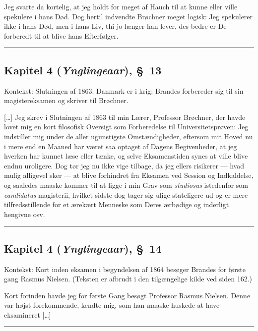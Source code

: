 \documentclass[12pt,a4paper]{article}
\begin{document}
Jeg svarte da kortelig, at jeg holdt for meget af Hauch til at kunne
eller ville spekulere i hans Død. Dog hertil indvendte Brøchner meget
logisk: Jeg spekulerer ikke i hans Død, men i hans Liv, thi jo længer han
lever, des bedre er De forberedt til at blive hans Efterfølger.

\bigskip\hrule\bigskip

\subsection*{Kapitel 4 (\emph{Ynglingeaar}), §~13}

\noindent Kontekst: Slutningen af 1863. Danmark er i krig; Brandes
forbereder sig til sin magistereksamen og skriver til Brøchner.

\medskip

[\ldots] Jeg skrev i Slutningen af 1863 til min Lærer,
Professor Brøchner, der havde lovet mig en kort filosofisk Oversigt som
Forberedelse til Universitetsprøven: Jeg indstiller mig under de aller
ugunstigste Omstændigheder, eftersom mit Hoved nu i mere end en Maaned
har været saa optaget af Dagens Begivenheder, at jeg hverken har kunnet
læse eller tænke, og selve Eksamenstiden synes at ville blive endnu
uroligere. Dog tør jeg nu ikke vige tilbage, da jeg ellers risikerer ---
hvad mulig alligevel sker --- at blive forhindret fra Eksamen ved Session
og Indkaldelse, og saaledes maaske kommer til at ligge i min Grav som
\textit{studiosus} istedenfor som \textit{candidatus} magisterii, hvilket
sidste dog tager sig ulige stateligere ud og er mere tilfredsstillende
for et ærekært Menneske som Deres ærbødige og inderligt hengivne osv.

\bigskip\hrule\bigskip

\subsection*{Kapitel 4 (\emph{Ynglingeaar}), §~14}

\noindent Kontekst: Kort inden eksamen i begyndelsen af 1864 besøger
Brandes for første gang Rasmus Nielsen. (Teksten er afbrudt i den
tilgængelige kilde ved siden 162.)

\medskip

Kort forinden havde jeg for første Gang besøgt Professor Rasmus Nielsen.
Denne var højst forekommende, kendte mig, som han maaske huskede at have
eksamineret [\ldots]

\bigskip\hrule\bigskip
\end{document}
